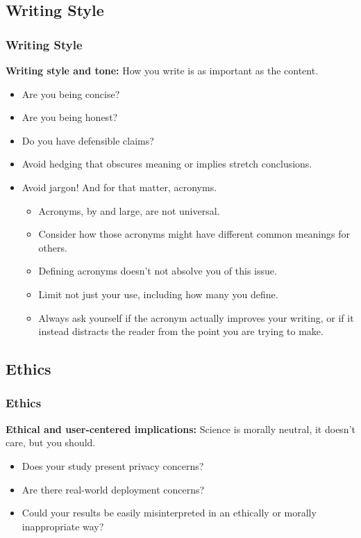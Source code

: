 \documentclass[aspectratio=169]{beamer} %
\begin{document}
	\subsection{Writing Style}
	\begin{frame}
	\frametitle{Writing Style}
		{\bf Writing style and tone:} How you write is as important as the content.
		\begin{itemize}
			\item Are you being concise?
			\item Are you being honest?
			\item Do you have defensible claims?
			\item Avoid hedging that obscures meaning or implies stretch conclusions.
			\item Avoid jargon!  And for that matter, acronyms.
			\begin{itemize}
				\item Acronyms, by and large, are not universal.
				\item Consider how those acronyms might have different common meanings for others.
				\item Defining acronyms doesn't not absolve you of this issue.
				\item Limit not just your use, including how many you define.
				\item Always ask yourself if the acronym actually improves your writing, or if it instead distracts the reader from the point you are trying to make.
			\end{itemize}
		\end{itemize}
	\end{frame}

	\subsection{Ethics}
	\begin{frame}
	\frametitle{Ethics}
		{\bf Ethical and user-centered implications:} Science is morally neutral, it doesn't care, but you should. 
		\begin{itemize}
			\item Does your study present privacy concerns?
			\item Are there real-world deployment concerns?
			\item Could your results be easily misinterpreted in an ethically or morally inappropriate way?
		\end{itemize}
	\end{frame}
\end{document}

